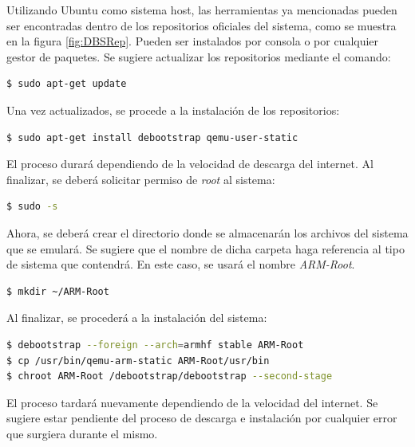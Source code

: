 Utilizando Ubuntu como sistema host, las herramientas ya mencionadas pueden ser encontradas dentro de los repositorios oficiales del sistema, como se muestra en la figura \ref{fig:DBSRep}. Pueden ser instalados por consola o por cualquier gestor de paquetes. Se sugiere actualizar los repositorios mediante el comando:

\begin{lstlisting}[language=bash]
$ sudo apt-get update

\end{lstlisting}
Una vez actualizados, se procede a la instalación de los repositorios:

\begin{lstlisting}[language=bash]
$ sudo apt-get install debootstrap qemu-user-static
\end{lstlisting}

El proceso durará dependiendo de la velocidad de descarga del internet. Al finalizar, se deberá solicitar permiso de \textit{root} al sistema:

\begin{lstlisting}[language=bash]
$ sudo -s
\end{lstlisting}

Ahora, se deberá crear el directorio donde se almacenarán los archivos del sistema que se emulará. Se sugiere que el nombre de dicha carpeta haga referencia al tipo de sistema que contendrá. En este caso, se usará el nombre \textit{ARM-Root}.

\begin{lstlisting}[language=bash]
$ mkdir ~/ARM-Root
\end{lstlisting}

Al finalizar, se procederá a la instalación del sistema:

\begin{lstlisting}[language=bash]
$ debootstrap --foreign --arch=armhf stable ARM-Root
$ cp /usr/bin/qemu-arm-static ARM-Root/usr/bin
$ chroot ARM-Root /debootstrap/debootstrap --second-stage
\end{lstlisting}

El proceso tardará nuevamente dependiendo de la velocidad del internet. Se sugiere estar pendiente del proceso de descarga e instalación por cualquier error que surgiera durante el mismo\footnotemark.


